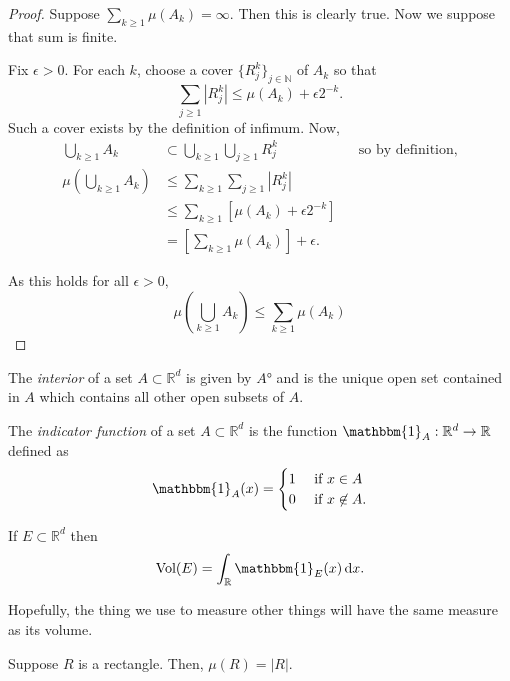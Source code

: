 \documentclass{amsart}
\newcommand{\bracks}[1]{\left[ #1\right]}
\theoremstyle{definition}
\numberwithin{equation}{section}
\newcommand{\s}[1]{\{#1\}}
\newcommand{\n}{\not}
\newcommand{\nin}{\n\in}
\newcommand{\IF}{\text{ if }}
\newcommand{\Vol}{\text{Vol}}
\newcommand{\ind}{\mathbbm{1}}
\newcommand{\N}{\mathbb{N}}
\newcommand{\R}{\mathbb{R}}
\newcommand*\diff{\mathop{}\!\mathrm{d}}
\begin{document}
    \begin{proof}

      Suppose $\sum_{k \geq 1}\mu(A_k) = \infty$. Then this is clearly true. Now we suppose that sum is finite.

      Fix $\epsilon > 0$. For each $k$, choose a cover $\s{R^k_j}_{j\in\N}$ of $A_k$ so that
      \[\sum_{j \geq 1}|R_j^k| \leq \mu(A_k) + \epsilon 2^{-k}.\]
      Such a cover exists by the definition of infimum. Now,
      \begin{align*}
        \bigcup_{k \geq 1}A_k &\subset \bigcup_{k \geq 1} \bigcup_{j \geq 1}R_j^k &&\text{so by definition,}\\
        \mu(\bigcup_{k \geq 1}A_k) &\leq \sum_{k \geq 1}\sum_{j \geq 1} |R_j^k|\\
        &\leq \sum_{k \geq 1}[\mu(A_k) + \epsilon 2^{-k}]\\
        &= \bracks{\sum_{k \geq 1}\mu(A_k)} + \epsilon.
      \end{align*}

      As this holds for all $\epsilon > 0,$
      \[\mu(\bigcup_{k \geq 1}A_k) \leq \sum_{k \geq 1}\mu(A_k)\]

    \end{proof}

  \begin{definition-prime}

    The \emph{interior} of a set $A \subset \R^d$ is given by $A°$ and is the unique open set contained in $A$ which contains all other open subsets of $A$.

  \end{definition-prime}

  \begin{definition-prime}

    The \emph{indicator function} of a set $A \subset \R^d$ is the function $\ind_A:\R^d \to \R$ defined as
    \[\ind_A(x) = \begin{cases}1 & \IF x \in A\\ 0 & \IF x \nin A.\end{cases}\]

  \end{definition-prime}

  \begin{recall}

    If $E \subset \R^d$ then \[\Vol(E) = \int_\R \ind_E(x) \diff x.\]

  \end{recall}

  Hopefully, the thing we use to measure other things will have the same measure as its volume.
  \begin{theorem}

    Suppose $R$ is a rectangle. Then, $\mu(R) = |R|.$

  \end{theorem}
\end{document}
